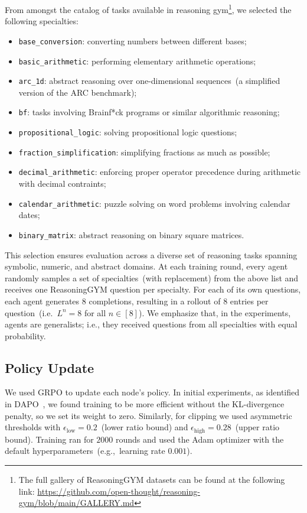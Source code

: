 \documentclass[11pt, a4paper, logo, singlecolumn, copyright]{gensyn}
\newcommand{\SAPO}{\textbf{SAPO}}
\begin{document}
From amongst the catalog of tasks available in reasoning gym\footnote{The full gallery of ReasoningGYM datasets can be found at the following link: \href{https://github.com/open-thought/reasoning-gym/blob/main/GALLERY.md}{https://github.com/open-thought/reasoning-gym/blob/main/GALLERY.md}}, we selected the following specialties: 
\begin{itemize}
    \item \texttt{base\_conversion}: converting numbers between different bases;
    \item \texttt{basic\_arithmetic}: performing elementary arithmetic operations;
    \item \texttt{arc\_1d}: abstract reasoning over one-dimensional sequences~(a simplified version of the ARC benchmark);
    \item \texttt{bf}: tasks involving Brainf*ck programs or similar algorithmic reasoning;
    \item \texttt{propositional\_logic}: solving propositional logic questions;
    \item \texttt{fraction\_simplification}: simplifying fractions as much as possible;
    \item \texttt{decimal\_arithmetic}: enforcing proper operator precedence during arithmetic with decimal contraints;
    \item \texttt{calendar\_arithmetic}: puzzle solving on word problems involving calendar dates;
    \item \texttt{binary\_matrix}: abstract reasoning on binary square matrices.
\end{itemize}
This selection ensures evaluation across a diverse set of reasoning tasks spanning symbolic, numeric, and abstract domains. At each training round, every agent randomly samples a set of specialties~(with replacement) from the above list and receives one ReasoningGYM question per specialty. For each of its own questions, each agent generates $8$ completions, resulting in a rollout of 8 entries per question~(i.e.~$L^n=8$ for all $n\in[8]$). We emphasize that, in the experiments, agents are generalists; i.e., they received questions from all specialties with equal probability.

\subsection{Policy Update}\label{subsec:local_alg}
We used GRPO to update each node's policy. In initial experiments, as identified in DAPO~\citep{yu2025dapoopensourcellmreinforcement}, we found training to be more efficient without the KL-divergence penalty, so we set its weight to zero. Similarly, for clipping we used asymmetric thresholds with $\epsilon_{\text{low}} = 0.2$~(lower ratio bound) and $\epsilon_{\text{high}} = 0.28$~(upper ratio bound). Training ran for $2000$ rounds and used the Adam optimizer with the default hyperparameters~(e.g.,~learning rate $0.001$).
\end{document}
